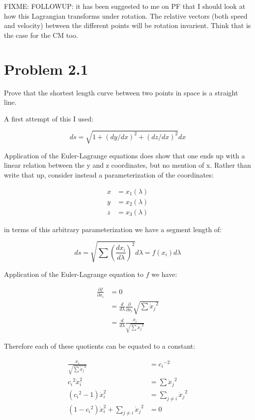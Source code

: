 \documentclass{article}      %
\newcommand{\xdot}[0]{\dot{x}}
\newcommand{\PD}[2]{\frac{\partial {#2}}{\partial {#1}}}
\begin{document}
FIXME: FOLLOWUP: it has been suggested to me on PF that I should look at how this Lagrangian transforms under rotation.  The relative vectors (both speed and velocity) between the different points will be rotation invarient.  Think that is the case for the CM too.

\section{ Problem 2.1 }

Prove that the shortest length curve between two points in space is a straight line.

A first attempt of this I used:

\begin{equation*}
ds = \sqrt{ 1 + (dy/dx)^2 + (dz/dx)^2 } dx
\end{equation*}

Application of the Euler-Lagrange equations does show that one ends up with a linear relation between the y and z coordinates, but no mention of x.  Rather than write that up, consider instead a parameterization of the coordinates:

\begin{align*}
x &= x_1(\lambda) \\
y &= x_2(\lambda) \\
z &= x_3(\lambda)
\end{align*}

in terms of this arbitrary parameterization we have a segment length of:

\begin{equation*}
ds = \sqrt{ \sum \left(\frac{d x_i}{d\lambda}\right)^2 } d \lambda = f\left(x_i\right) d\lambda
\end{equation*}

Application of the Euler-Lagrange equation to $f$ we have:

\begin{align*}
\PD{x_i}{f} 
&= 0 \\
&= \frac{d}{d\lambda} \PD{\xdot_i}{} \sqrt{ \sum {\xdot_j}^2 } \\
&= \frac{d}{d\lambda} \frac{ \xdot_i }{\sqrt{ \sum {\xdot_j}^2 }}
\end{align*}

Therefore each of these quotients can be equated to a constant:

\begin{align*}
\frac{ \xdot_i }{\sqrt{ \sum {\xdot_j}^2 }} &= {c_i}^{-2} \\
{c_i}^2 \xdot_i^2 &= \sum {\xdot_j}^2 \\
({c_i}^2 -1)\xdot_i^2 &= \sum_{j \ne i} {\xdot_j}^2 \\
(1 - {c_i}^2)\xdot_i^2 + \sum_{j \ne i} {\xdot_j}^2 &= 0 
\end{align*}
\end{document}
